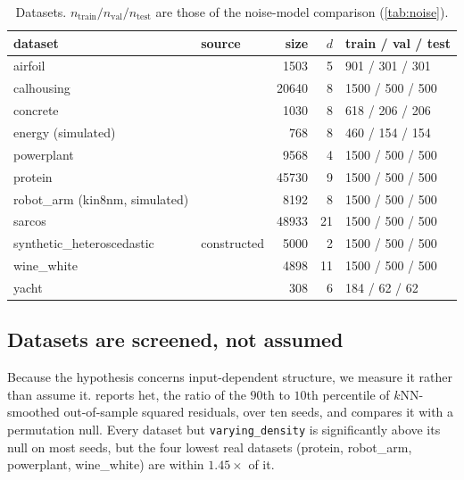 \documentclass[11pt]{article}
\begin{document}
\begin{table}[h]\centering
\caption{Datasets. $n_{\text{train}}/n_{\text{val}}/n_{\text{test}}$ are those of the
noise-model comparison (\cref{tab:noise}).}
\label{tab:data}
\small
\begin{tabular}{llrrl}
\toprule
dataset & source & size & $d$ & train / val / test \\
\midrule
airfoil & \citet{brooks1989airfoil} & 1503 & 5 & 901 / 301 / 301 \\
calhousing & \citet{pace1997calhousing} & 20640 & 8 & 1500 / 500 / 500 \\
concrete & \citet{yeh1998concrete} & 1030 & 8 & 618 / 206 / 206 \\
energy (simulated) & \citet{tsanas2012energy} & 768 & 8 & 460 / 154 / 154 \\
powerplant & \citet{tufekci2014ccpp} & 9568 & 4 & 1500 / 500 / 500 \\
protein & \citet{rana2013casp} & 45730 & 9 & 1500 / 500 / 500 \\
robot\_arm (kin8nm, simulated) & \citet{rasmussen1996delve} & 8192 & 8 & 1500 / 500 / 500 \\
sarcos & \citet{vijayakumar2000lwpr} & 48933 & 21 & 1500 / 500 / 500 \\
synthetic\_heteroscedastic & constructed & 5000 & 2 & 1500 / 500 / 500 \\
wine\_white & \citet{cortez2009wine} & 4898 & 11 & 1500 / 500 / 500 \\
yacht & \citet{gerritsma1981yacht} & 308 & 6 & 184 / 62 / 62 \\
\bottomrule
\end{tabular}
\end{table}

\subsection{Datasets are screened, not assumed}
\label{sec:screen}
Because the hypothesis concerns input-dependent structure, we measure it rather than
assume it.  reports $\mathrm{het}$, the ratio of the $90$th to $10$th
percentile of $k$NN-smoothed out-of-sample squared residuals, over ten seeds, and
compares it with a permutation null. Every dataset but \texttt{varying\_density} is
significantly above its null on most seeds, but the four lowest real datasets
(protein, robot\_arm, powerplant, wine\_white) are within $1.45\times$ of it.

\begin{table}[h]\centering
\caption{Measured input-dependent residual variance over ten seeds: het (mean and sd),
the mean of its permutation null (residuals shuffled over the inputs), and their ratio.
The null is not $1$: it depends on the residuals' tails and the test-set size. On small
datasets a single seed can mislead (yacht ranges from $3.4$ to $20.1$). Generated by
\texttt{src/measure\_hetero\_seeds.py} and \texttt{src/measure\_hetero\_null.py}.}
\label{tab:screen}
\small

\end{table}
\end{document}
